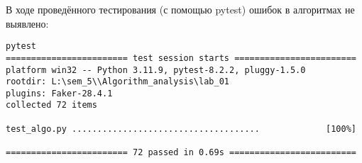 В ходе проведённого тестирования (с помощью pytest) ошибок в алгоритмах не выявлено:

\vspace{0.25cm}
\begin{lstlisting}[caption=тестирование алгоритмов с помощью pytest]
pytest
======================== test session starts ========================
platform win32 -- Python 3.11.9, pytest-8.2.2, pluggy-1.5.0
rootdir: L:\sem_5\\Algorithm_analysis\lab_01
plugins: Faker-28.4.1
collected 72 items                                                                                                                                                                

test_algo.py .....................................             [100%]

======================== 72 passed in 0.69s =========================
\end{lstlisting}

\newpage
